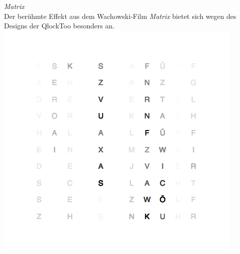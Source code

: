 \emph{Matrix} \\
Der berühmte Effekt aus dem Wachowski-Film \emph{Matrix} bietet sich wegen des Designs der QlockToo besonders an.
\includegraphics[width=\columnwidth]{Abbildungen/Demo/Matrix}




